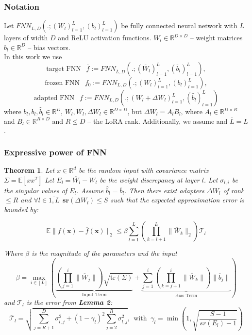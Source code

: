 \documentclass{article}
\newtheorem{theorem}{Theorem}
\begin{document}
            \subsubsection{Notation}
                Let $FNN_{L,D}(.;(W_l)_{l=1}^L, (b_l)_{l=1}^L)$ be fully connected neural network with $L$ layers of width $D$ and ReLU activation functions. $W_l\in \mathbb{R}^{D\times D}$ -- weight matrices $b_l\in \mathbb{R}^D$ -- bias vectors.\\ In this work we use 
                $$\text{target FNN  }~~ \overline{f}:=FNN_{\overline{L},D}(.;(\overline{W}_l)_{l=1}^L, (\overline{b}_l)_{l=1}^L), $$ 
                $$\text{frozen FNN }~~ f_0:= FNN_{L,D}(.;(W_l)_{l=1}^L, (b_l)_{l=1}^L),$$
                $$\text{adapted FNN }~~ f:=FNN_{L,D}(.;(W_l + \Delta W_l)_{l=1}^L, (\hat{b}_l)_{l=1}^L)$$
                where $b_l, \overline{b}_l, \hat{b}_l \in \mathbb{R}^D$, $W_l, \overline{W}_l, \Delta W_l \in \mathbb{R}^{D\times D}$, but $\Delta W_l = A_l B_l$, where $A_l\in \mathbb{R}^{D\times R}$ and $B_l\in \mathbb{R}^{R\times D}$ and $R\leqslant D$ -- the LoRA rank. Additionally, we assume  and $\overline{L} = L$.  \\
                \subsubsection{Expressive power of FNN}
                
                \begin{theorem} Let $x\in \mathbb{R}^d$ be the random input with covariance matrix $\Sigma = \mathbb{E}[xx^T]$
                    Let $E_l = \overline{W}_l - W_l$ be the weight discrepancy at layer $l$. Let $\sigma_{l,i}$ be the singular values of $E_l$. Assume $\hat{b}_l = \overline{b}_l$. Then there exist adapters $\Delta W_l$ of rank $\leqslant R$ and $\forall l \in\overline{1, L}~~\mathbf{sr}(\Delta W_l) \leqslant S$ such that the expected approximation error is bounded by:

                    $$ \mathbb{E} \| f(\mathbf{x}) - \overline{f}(\mathbf{x}) \|_2 \leqslant \beta \sum_{l=1}^L \left( \prod_{k=l+1}^L \| \overline{W}_k \|_2 \right) \mathcal{T}_l $$

                    Where $\beta$ is the magnitude of the parameters and the input
                    $$ \beta = \max_{i \in [L]} \left( \underbrace{ \left( \prod_{j=1}^i \|\overline{W}_j\| \right) \sqrt{\text{tr}(\Sigma)} }_{\text{Input Term}} + \underbrace{ \sum_{j=1}^i \left( \prod_{k=j+1}^i \|\overline{W}_k\| \right) \|\overline{b}_j\| }_{\text{Bias Term}} \right) $$ 
                    and $\mathcal{T}_l$ is the error from \textbf{Lemma 2}:
                    $$ \mathcal{T}_l = \sqrt{ \sum_{j=R+1}^D \sigma_{l,j}^2 + (1 - \gamma_l)^2 \sum_{j=2}^R \sigma_{l,j}^2 }, ~~\text{with } ~ \gamma_l = \min\left(1, \sqrt{\frac{S-1}{sr(E_l)-1}}\right)$$
                \end{theorem}
\end{document}
